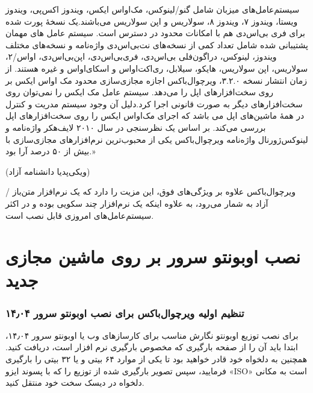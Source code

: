 سیستم‌عامل‌های میزبان شامل گنو/لینوکس، مک‌اواس ایکس، ویندوز اکس‌پی، ویندوز ویستا، ویندوز ۷، ویندوز ۸، سولاریس و اپن سولاریس می‌باشند.یک نسخهٔ پورت شده برای فری بی‌اس‌دی هم با امکانات محدود در دسترس است. سیستم عامل های مهمان پشتیبانی شده شامل تعداد کمی از نسخه‌های نت‌بی‌اس‌دی واژه‌نامه و نسخه‌های مختلف ویندوز، لینوکس، دراگون‌فلی بی‌اس‌دی، فری‌بی‌اس‌دی، اپن‌بی‌اس‌دی، اواس/۲، سولاریس، اپن سولاریس، هایکو، سیلابل، ری‌اکت‌اواس و اسکای‌اواس و غیره  هستند. از زمان انتشار نسخه ۳.۲.۰، ویرچوال‌باکس اجازه مجازی‌سازی محدود مک اواس ایکس بر روی سخت‌افزارهای اپل را می‌دهد.  سیستم عامل مک ایکس را نمی‌توان روی سخت‌افزارهای دیگر به صورت قانونی اجرا کرد.دلیل آن وجود سیستم مدریت و کنترل در همهٔ ماشین‌های اپل می باشد که اجرای مک‌اواس ایکس را روی سخت‌افزارهای اپل بررسی می‌کند. بر اساس یک نظرسنجی در سال ۲۰۱۰ لایف‌هکر واژه‌نامه  و لینوکس‌ژورنال واژه‌نامه ویرچوال‌باکس یکی از محبوب‌ترین نرم‌افزارهای مجازی‌سازی با بیش از ۵۰ درصد آرا بود.»
\begin{flushleft}
     (ویکی‌پدیا دانشنامه آزاد)
\end{flushleft}

ویرچوال‌باکس علاوه بر ویژگی‌های فوق، این مزیت را دارد که یک نرم‌افزار متن‌باز / آزاد به شمار می‌رود، به علاوه اینکه یک نرم‌افزار چند سکویی بوده و در اکثر سیستم‌عامل‌های امروزی قابل نصب است.
\part*{نصب اوبونتو سرور بر روی ماشین مجازی جدید}
\section{تنظیم اولیه ویرچوال‌باکس برای نصب اوبونتو سرور ۱۴٫۰۴}
برای نصب توزیع اوبونتو نگارش مناسب برای کارسازهای وب یا اوبونتو سرور ۱۴٫۰۴، ابتدا باید آن را از صفحه بارگیری که مخصوص بارگیری نرم افزار است، دریافت کنید. همچنین به دلخواه خود قادر خواهید بود تا یکی از موارد ۶۴ بیتی و یا ۳۲ بیتی را بارگیری فرمایید، سپس تصویر بارگیری شده از توزیع  را که با پسوند ایزو «ISO» است به مکانی دلخواه در دیسک سخت خود منتقل کنید.

